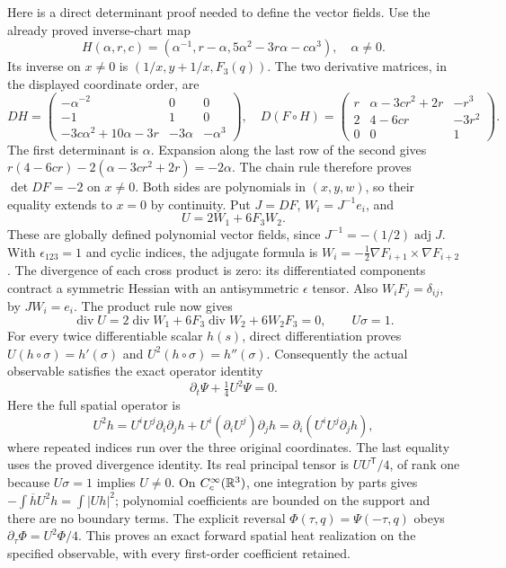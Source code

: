 Here is a direct determinant proof needed to define the vector fields.
Use the already proved inverse-chart map
\[
H(\alpha,r,c)=(\alpha^{-1},r-\alpha,
                  5\alpha^2-3r\alpha-c\alpha^3),\quad \alpha\ne0.
\]
Its inverse on $x\ne0$ is $(1/x,y+1/x,F_3(q))$.
The two derivative matrices, in the displayed coordinate order, are
\[
DH=\begin{pmatrix}
-\alpha^{-2}&0&0\\
-1&1&0\\
-3c\alpha^2+10\alpha-3r&-3\alpha&-\alpha^3
\end{pmatrix},\quad
D(F\circ H)=\begin{pmatrix}
r&\alpha-3cr^2+2r&-r^3\\
2&4-6cr&-3r^2\\
0&0&1
\end{pmatrix}.
\]
The first determinant is $\alpha$. Expansion along the last row of
the second gives $r(4-6cr)-2(\alpha-3cr^2+2r)=-2\alpha$.
The chain rule therefore proves $\det DF=-2$ on $x\ne0$.
Both sides are polynomials in $(x,y,w)$, so their equality extends
to $x=0$ by continuity. Put $J=DF$, $W_i=J^{-1}e_i$, and
\[
U=2W_1+6F_3W_2.
\]
These are globally defined polynomial vector fields, since
$J^{-1}=-(1/2)\operatorname{adj}J$. With $\epsilon_{123}=1$ and
cyclic indices, the adjugate formula is
$W_i=-\tfrac12\nabla F_{i+1}\times\nabla F_{i+2}$.
The divergence of each cross product is zero: its differentiated
components contract a symmetric Hessian with an antisymmetric
$\epsilon$ tensor. Also $W_iF_j=\delta_{ij}$, by $JW_i=e_i$.
The product rule now gives
\[
\operatorname{div}U=2\operatorname{div}W_1+
  6F_3\operatorname{div}W_2+6W_2F_3=0,\qquad U\sigma=1.
\]
For every twice differentiable scalar $h(s)$, direct differentiation
proves $U(h\circ\sigma)=h'(\sigma)$ and
$U^2(h\circ\sigma)=h''(\sigma)$. Consequently the actual observable
satisfies the exact operator identity
\begin{equation}
\partial_t\Psi+\tfrac14 U^2\Psi=0.
\label{eq:eo-rankone}
\end{equation}
Here the full spatial operator is
\[
U^2h=U^iU^j\partial_i\partial_jh+
             U^i(\partial_iU^j)\partial_jh
     =\partial_i(U^iU^j\partial_jh),
\]
where repeated indices run over the three original coordinates.
The last equality uses the proved divergence identity. Its real
principal tensor is $UU^{\mathsf T}/4$, of rank one because
$U\sigma=1$ implies $U\ne0$. On $C_c^\infty(\mathbb R^3)$, one integration
by parts gives $-\int\overline h U^2h=\int|Uh|^2$; polynomial
coefficients are bounded on the support and there are no boundary
terms. The explicit reversal $\Phi(\tau,q)=\Psi(-\tau,q)$ obeys
$\partial_\tau\Phi=U^2\Phi/4$. This proves an exact forward
spatial heat realization on the specified observable, with every
first-order coefficient retained.

